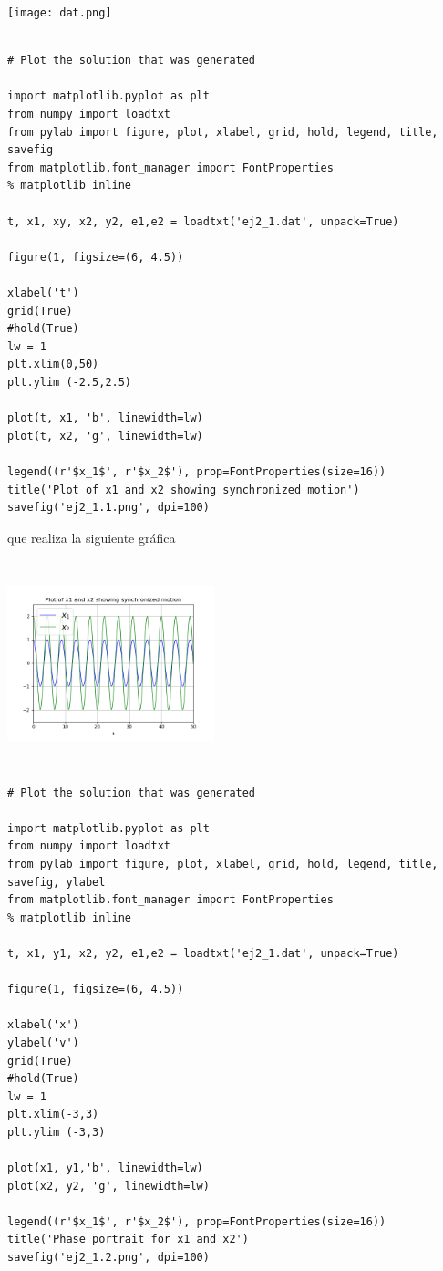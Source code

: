 \documentclass{article}
\begin{document}
\begin{center}
  \texttt{[image: dat.png]}
\end{center}

\begin{verbatim}

# Plot the solution that was generated

import matplotlib.pyplot as plt
from numpy import loadtxt
from pylab import figure, plot, xlabel, grid, hold, legend, title, savefig
from matplotlib.font_manager import FontProperties
% matplotlib inline

t, x1, xy, x2, y2, e1,e2 = loadtxt('ej2_1.dat', unpack=True)

figure(1, figsize=(6, 4.5))

xlabel('t')
grid(True)
#hold(True)
lw = 1
plt.xlim(0,50)
plt.ylim (-2.5,2.5)

plot(t, x1, 'b', linewidth=lw)
plot(t, x2, 'g', linewidth=lw)

legend((r'$x_1$', r'$x_2$'), prop=FontProperties(size=16))
title('Plot of x1 and x2 showing synchronized motion')
savefig('ej2_1.1.png', dpi=100)
\end{verbatim}

que realiza la siguiente gráfica

\begin{center}
  \includegraphics[width=6cm, height=6cm]{ej2_11.png}
\end{center}

\begin{verbatim}
# Plot the solution that was generated

import matplotlib.pyplot as plt
from numpy import loadtxt
from pylab import figure, plot, xlabel, grid, hold, legend, title, savefig, ylabel
from matplotlib.font_manager import FontProperties
% matplotlib inline

t, x1, y1, x2, y2, e1,e2 = loadtxt('ej2_1.dat', unpack=True)

figure(1, figsize=(6, 4.5))

xlabel('x')
ylabel('v')
grid(True)
#hold(True)
lw = 1
plt.xlim(-3,3)
plt.ylim (-3,3)

plot(x1, y1,'b', linewidth=lw)
plot(x2, y2, 'g', linewidth=lw)

legend((r'$x_1$', r'$x_2$'), prop=FontProperties(size=16))
title('Phase portrait for x1 and x2')
savefig('ej2_1.2.png', dpi=100)
\end{verbatim}
\end{document}
